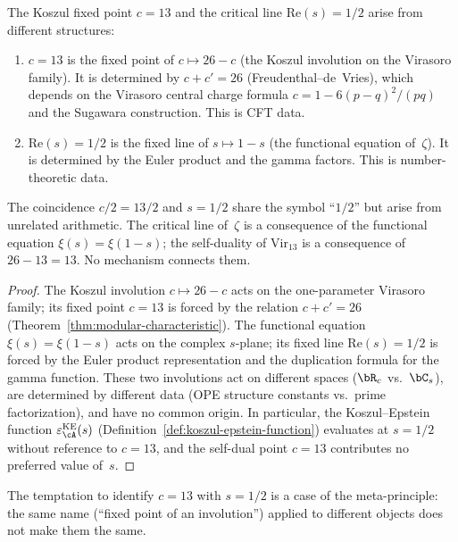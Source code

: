 \begin{proposition}
\label{prop:two-fixed-points}
\ClaimStatusConditional
{}%
%
The Koszul fixed point $c = 13$ and the critical line
$\mathrm{Re}(s) = 1/2$ arise from different structures:
\begin{enumerate}[label=\textup{(\roman*)}]
\item $c = 13$ is the fixed point of $c \mapsto 26 - c$ (the
 Koszul involution on the Virasoro family). It is determined
 by $c + c' = 26$ (Freudenthal--de~Vries), which depends on
 the Virasoro central charge formula $c = 1 - 6(p-q)^2/(pq)$
 and the Sugawara construction. This is CFT data.
\item $\mathrm{Re}(s) = 1/2$ is the fixed line of
 $s \mapsto 1 - s$ (the functional equation of~$\zeta$). It is
 determined by the Euler product and the gamma factors. This
 is number-theoretic data.
\end{enumerate}
The coincidence $c/2 = 13/2$ and $s = 1/2$ share the symbol
``$1/2$'' but arise from unrelated arithmetic. The critical
line of~$\zeta$ is a consequence of the functional equation
$\xi(s) = \xi(1-s)$; the self-duality of $\mathrm{Vir}_{13}$
is a consequence of $26 - 13 = 13$. No mechanism connects them.
\end{proposition}

\begin{proof}
The Koszul involution $c \mapsto 26 - c$ acts on the
one-parameter Virasoro family; its fixed point $c = 13$
is forced by the relation $c + c' = 26$
(Theorem~\ref{thm:modular-characteristic}).
The functional equation $\xi(s) = \xi(1 - s)$ acts on the
complex $s$-plane; its fixed line $\mathrm{Re}(s) = 1/2$
is forced by the Euler product representation and the
duplication formula for the gamma function.
These two involutions act on different spaces
($\bR_c$ vs.\ $\bC_s$), are determined by different data
(OPE structure constants vs.\ prime factorization), and have
no common origin. In particular, the Koszul--Epstein function
$\varepsilon^{\mathrm{KE}}_{\cA}(s)$
(Definition~\ref{def:koszul-epstein-function})
evaluates at $s = 1/2$ without reference to $c = 13$,
and the self-dual point $c = 13$ contributes no preferred
value of~$s$.
\end{proof}

\begin{remark}
The temptation to identify $c = 13$ with $s = 1/2$ is a
case of the meta-principle: the same name (``fixed
point of an involution'') applied to different objects does not
make them the same.
\end{remark}

